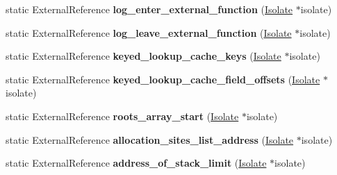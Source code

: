 \begin{DoxyCompactItemize}
\item 
\hypertarget{classv8_1_1internal_1_1_b_a_s_e___e_m_b_e_d_d_e_d_a237d49d6bab3dec80fe7886edf7c234e}{}static External\+Reference {\bfseries log\+\_\+enter\+\_\+external\+\_\+function} (\hyperlink{classv8_1_1internal_1_1_isolate}{Isolate} $\ast$isolate)\label{classv8_1_1internal_1_1_b_a_s_e___e_m_b_e_d_d_e_d_a237d49d6bab3dec80fe7886edf7c234e}

\item 
\hypertarget{classv8_1_1internal_1_1_b_a_s_e___e_m_b_e_d_d_e_d_a901132e0a01dee61cf37860329a7c852}{}static External\+Reference {\bfseries log\+\_\+leave\+\_\+external\+\_\+function} (\hyperlink{classv8_1_1internal_1_1_isolate}{Isolate} $\ast$isolate)\label{classv8_1_1internal_1_1_b_a_s_e___e_m_b_e_d_d_e_d_a901132e0a01dee61cf37860329a7c852}

\item 
\hypertarget{classv8_1_1internal_1_1_b_a_s_e___e_m_b_e_d_d_e_d_ab6540b990ab969af8b312e831a23a3c8}{}static External\+Reference {\bfseries keyed\+\_\+lookup\+\_\+cache\+\_\+keys} (\hyperlink{classv8_1_1internal_1_1_isolate}{Isolate} $\ast$isolate)\label{classv8_1_1internal_1_1_b_a_s_e___e_m_b_e_d_d_e_d_ab6540b990ab969af8b312e831a23a3c8}

\item 
\hypertarget{classv8_1_1internal_1_1_b_a_s_e___e_m_b_e_d_d_e_d_ae6c396b5630c867f586fd02f2043e8ae}{}static External\+Reference {\bfseries keyed\+\_\+lookup\+\_\+cache\+\_\+field\+\_\+offsets} (\hyperlink{classv8_1_1internal_1_1_isolate}{Isolate} $\ast$isolate)\label{classv8_1_1internal_1_1_b_a_s_e___e_m_b_e_d_d_e_d_ae6c396b5630c867f586fd02f2043e8ae}

\item 
\hypertarget{classv8_1_1internal_1_1_b_a_s_e___e_m_b_e_d_d_e_d_a6fae0ff3eb36e6227773f181557d59e2}{}static External\+Reference {\bfseries roots\+\_\+array\+\_\+start} (\hyperlink{classv8_1_1internal_1_1_isolate}{Isolate} $\ast$isolate)\label{classv8_1_1internal_1_1_b_a_s_e___e_m_b_e_d_d_e_d_a6fae0ff3eb36e6227773f181557d59e2}

\item 
\hypertarget{classv8_1_1internal_1_1_b_a_s_e___e_m_b_e_d_d_e_d_a929cba3a1ad522be283724c5968211f4}{}static External\+Reference {\bfseries allocation\+\_\+sites\+\_\+list\+\_\+address} (\hyperlink{classv8_1_1internal_1_1_isolate}{Isolate} $\ast$isolate)\label{classv8_1_1internal_1_1_b_a_s_e___e_m_b_e_d_d_e_d_a929cba3a1ad522be283724c5968211f4}

\item 
\hypertarget{classv8_1_1internal_1_1_b_a_s_e___e_m_b_e_d_d_e_d_a6f7ea2755cbedf672f1898921a29e5a0}{}static External\+Reference {\bfseries address\+\_\+of\+\_\+stack\+\_\+limit} (\hyperlink{classv8_1_1internal_1_1_isolate}{Isolate} $\ast$isolate)\label{classv8_1_1internal_1_1_b_a_s_e___e_m_b_e_d_d_e_d_a6f7ea2755cbedf672f1898921a29e5a0}


\end{DoxyCompactItemize}

